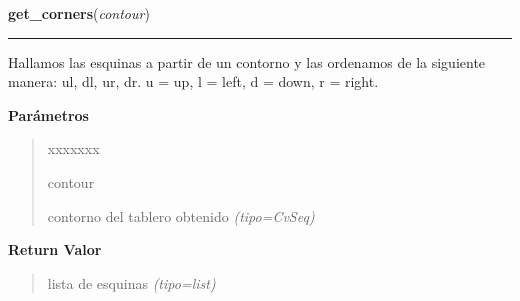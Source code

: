     \label{src:search_goban:get_corners}

    \vspace{0.5ex}

\hspace{.8\funcindent}\begin{boxedminipage}{\funcwidth}

    \raggedright \textbf{get\_corners}(\textit{contour})

    \vspace{-1.5ex}

    \rule{\textwidth}{0.5\fboxrule}
\setlength{\parskip}{2ex}
Hallamos las esquinas a partir de un contorno y las ordenamos de la siguiente manera: ul, dl, ur, dr.  u = up, l = left, d = down, r = right.

\setlength{\parskip}{1ex}
      \textbf{Parámetros}
      \vspace{-1ex}

      \begin{quote}
        \begin{Ventry}{xxxxxxx}

          \item[contour]


contorno del tablero obtenido
            {\it (tipo=CvSeq)}

        \end{Ventry}

      \end{quote}

      \textbf{Return Valor}
    \vspace{-1ex}

      \begin{quote}

lista de esquinas
      {\it (tipo=list)}

      \end{quote}

    \end{boxedminipage}

    \label{src:search_goban:filter_image}

    \vspace{0.5ex}

